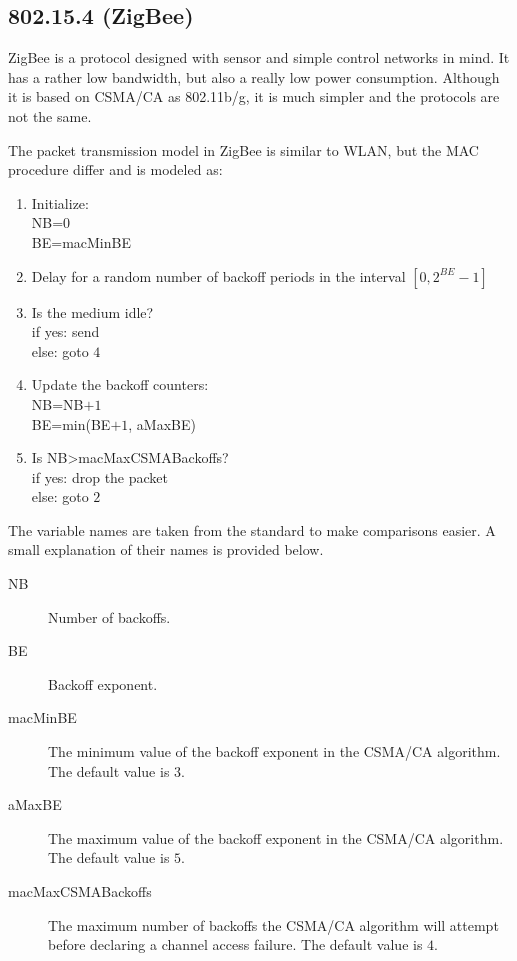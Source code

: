 \documentclass[final,twoside]{rapport}
\begin{document}
\subsection{802.15.4 (ZigBee)}
ZigBee is a protocol designed with sensor and simple control networks in mind.
It has a rather low bandwidth, but also a really low power consumption.
Although it is based on CSMA/CA as 802.11b/g, it is much simpler and the
protocols are not the same.

The packet transmission model in ZigBee is similar to WLAN, but the
MAC procedure differ and is modeled as:

\begin{enumerate}
 \item Initialize:\\
   NB=$0$\\
   BE=macMinBE
 \item Delay for a random number of backoff periods in the interval
   $[0, 2^{BE}-1]$
 \item Is the medium idle?\\
   \hspace*{5mm}  if yes: send\\
   \hspace*{5mm}  else: goto $4$
 \item Update the backoff counters:\\
   NB=NB$+1$\\
   BE=min(BE$+1$, aMaxBE)
 \item Is NB>macMaxCSMABackoffs?\\
   \hspace*{5mm}  if yes: drop the packet\\
   \hspace*{5mm}  else: goto $2$
\end{enumerate}
The variable names are taken from the standard to make comparisons
easier. A small explanation of their names is provided below.
\begin{description}
\item[NB] Number of backoffs.
\item[BE] Backoff exponent.
\item[macMinBE] The minimum value of the backoff exponent in the
  CSMA/CA algorithm. The default value is $3$.
\item[aMaxBE] The maximum value of the backoff exponent in the CSMA/CA
  algorithm. The default value is $5$.
\item[macMaxCSMABackoffs] The maximum number of backoffs the CSMA/CA
algorithm will attempt before declaring a channel access failure. The
default value is $4$.
\end{description}
\end{document}
